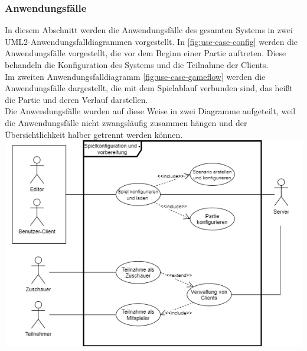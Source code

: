 \documentclass[12pt]{article}
\newcounter{fa}
\begin{document}
\subsubsection{Anwendungsfälle}
\label{sssec:use-cases}

In diesem Abschnitt werden die Anwendungsfälle des gesamten Systems in zwei UML2-Anwendungsfalldiagrammen vorgestellt. In \autoref{fig:use-case-config} werden die Anwendungsfälle vorgestellt, die vor dem Beginn einer Partie auftreten. Diese behandeln die Konfiguration des Systems und die Teilnahme der Clients. \\ Im zweiten Anwendungsfalldiagramm \autoref{fig:use-case-gameflow} werden die Anwendungsfälle dargestellt, die mit dem Spielablauf verbunden sind, das heißt die Partie und deren Verlauf darstellen. \\ Die Anwendungsfälle wurden auf diese Weise in zwei Diagramme aufgeteilt, weil die Anwendungsfälle nicht zwangsläufig zusammen hängen und der Übersichtlichkeit halber getrennt werden können. \\ 

\centering
\includegraphics[width=\textwidth]{images/Anwendungsfalldiagramm_Konfiguration}
\label{fig:use-case-config}
\flushleft

\vspace{2cm}
\end{document}
